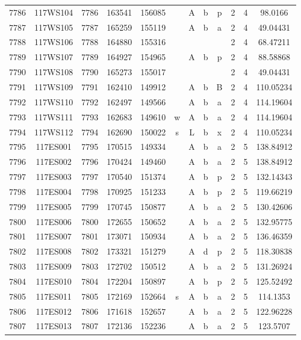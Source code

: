 \begin{tabular}{|*{12}{c|}}
7786 & 117WS104 & 7786 & 163541 & 156085 &  & A & b & p & 2 & 4 & 98.0166 \\ 
7787 & 117WS105 & 7787 & 165259 & 155119 &  & A & b & a & 2 & 4 & 49.04431 \\ 
7788 & 117WS106 & 7788 & 164880 & 155316 &  &  &  &  & 2 & 4 & 68.47211 \\ 
7789 & 117WS107 & 7789 & 164927 & 154965 &  & A & b & p & 2 & 4 & 88.58868 \\ 
7790 & 117WS108 & 7790 & 165273 & 155017 &  &  &  &  & 2 & 4 & 49.04431 \\ 
7791 & 117WS109 & 7791 & 162410 & 149912 &  & A & b & B & 2 & 4 & 110.05234 \\ 
7792 & 117WS110 & 7792 & 162497 & 149566 &  & A & b & a & 2 & 4 & 114.19604 \\ 
7793 & 117WS111 & 7793 & 162683 & 149610 & w & A & b & a & 2 & 4 & 114.19604 \\ 
7794 & 117WS112 & 7794 & 162690 & 150022 & s & L & b & x & 2 & 4 & 110.05234 \\ 
7795 & 117ES001 & 7795 & 170515 & 149334 &  & A & b & a & 2 & 5 & 138.84912 \\ 
7796 & 117ES002 & 7796 & 170424 & 149460 &  & A & b & a & 2 & 5 & 138.84912 \\ 
7797 & 117ES003 & 7797 & 170540 & 151374 &  & A & b & p & 2 & 5 & 132.14343 \\ 
7798 & 117ES004 & 7798 & 170925 & 151233 &  & A & b & p & 2 & 5 & 119.66219 \\ 
7799 & 117ES005 & 7799 & 170745 & 150877 &  & A & b & a & 2 & 5 & 130.42606 \\ 
7800 & 117ES006 & 7800 & 172655 & 150652 &  & A & b & a & 2 & 5 & 132.95775 \\ 
7801 & 117ES007 & 7801 & 173071 & 150934 &  & A & b & a & 2 & 5 & 136.46359 \\ 
7802 & 117ES008 & 7802 & 173321 & 151279 &  & A & d & p & 2 & 5 & 118.30838 \\ 
7803 & 117ES009 & 7803 & 172702 & 150512 &  & A & b & a & 2 & 5 & 131.26924 \\ 
7804 & 117ES010 & 7804 & 172204 & 150897 &  & A & b & p & 2 & 5 & 125.52492 \\ 
7805 & 117ES011 & 7805 & 172169 & 152664 & s & A & b & a & 2 & 5 & 114.1353 \\ 
7806 & 117ES012 & 7806 & 171618 & 152657 &  & A & b & a & 2 & 5 & 122.96228 \\ 
7807 & 117ES013 & 7807 & 172136 & 152236 &  & A & b & a & 2 & 5 & 123.5707 \\ 

\end{tabular}
